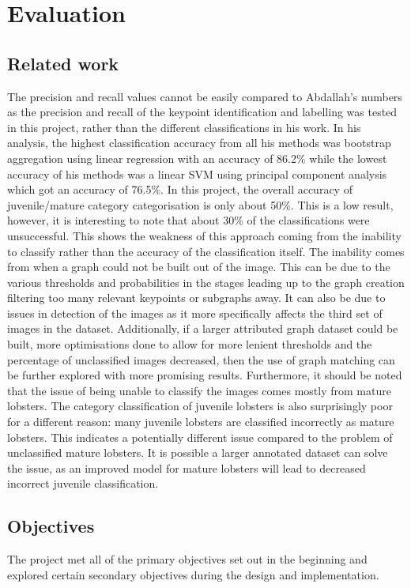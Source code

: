 \section{Evaluation}\label{sec:evaluation}


\subsection{Related work}
The precision and recall values cannot be easily compared to Abdallah's numbers \cite{lobster-thesis} as the precision and recall of the keypoint identification and labelling was tested in this project, rather than the different classifications in his work. In his analysis, the highest classification accuracy from all his methods was bootstrap aggregation using linear regression with an accuracy of 86.2\% while the lowest accuracy of his methods was a linear SVM using principal component analysis which got an accuracy of 76.5\%. 
\n
In this project, the overall accuracy of juvenile/mature category categorisation is only about 50\%. This is a low result, however, it is interesting to note that about 30\% of the classifications were unsuccessful. This shows the weakness of this approach coming from the inability to classify rather than the accuracy of the classification itself. The inability comes from when a graph could not be built out of the image. This can be due to the various thresholds and probabilities in the stages leading up to the graph creation filtering too many relevant keypoints or subgraphs away. It can also be due to issues in detection of the images as it more specifically affects the third set of images in the dataset. Additionally, if a larger attributed graph dataset could be built, more optimisations done to allow for more lenient thresholds and the percentage of unclassified images decreased, then the use of graph matching can be further explored with more promising results. Furthermore, it should be noted that the issue of being unable to classify the images comes mostly from mature lobsters.
\n
The category classification of juvenile lobsters is also surprisingly poor for a different reason: many juvenile lobsters are classified incorrectly as mature lobsters. This indicates a potentially different issue compared to the problem of unclassified mature lobsters. It is possible a larger annotated dataset can solve the issue, as an improved model for mature lobsters will lead to decreased incorrect juvenile classification. 

\subsection{Objectives}
The project met all of the primary objectives set out in the beginning and explored certain secondary objectives during the design and implementation. 
